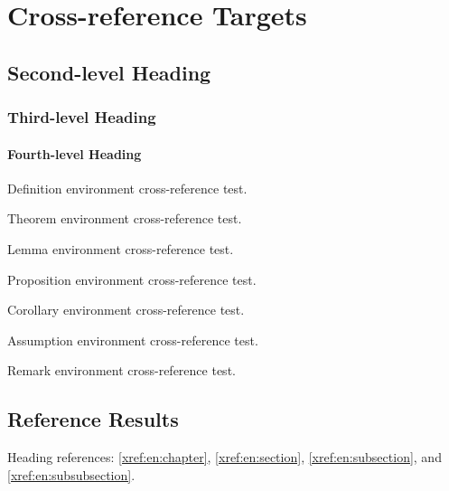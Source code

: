 \documentclass[english]{uestcthesis}
\begin{document}
\uestcfrontmatter
\uestctableofcontents
\uestcmainmatter

\chapter{Cross-reference Targets}\label{xref:en:chapter}
\section{Second-level Heading}\label{xref:en:section}
\subsection{Third-level Heading}\label{xref:en:subsection}
\subsubsection{Fourth-level Heading}\label{xref:en:subsubsection}

\begin{definition}\label{xref:en:definition}
Definition environment cross-reference test.
\end{definition}
\begin{theorem}\label{xref:en:theorem}
Theorem environment cross-reference test.
\end{theorem}
\begin{lemma}\label{xref:en:lemma}
Lemma environment cross-reference test.
\end{lemma}
\begin{proposition}\label{xref:en:proposition}
Proposition environment cross-reference test.
\end{proposition}
\begin{corollary}\label{xref:en:corollary}
Corollary environment cross-reference test.
\end{corollary}
\begin{assumption}\label{xref:en:assumption}
Assumption environment cross-reference test.
\end{assumption}
\begin{remark}\label{xref:en:remark}
Remark environment cross-reference test.
\end{remark}

\clearpage
\section{Reference Results}

Heading references: \autoref{xref:en:chapter}, \autoref{xref:en:section},
\autoref{xref:en:subsection}, and \autoref{xref:en:subsubsection}.
\end{document}
